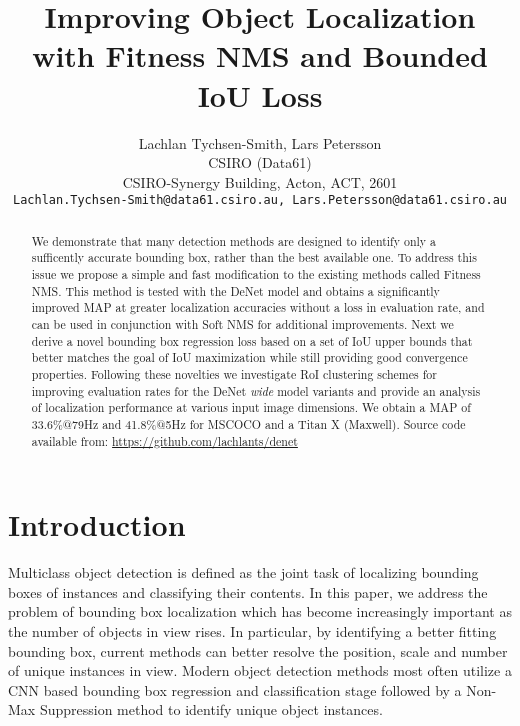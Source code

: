 \documentclass[10pt,twocolumn,letterpaper]{article}
\begin{document}
\title{Improving Object Localization with Fitness NMS and Bounded IoU Loss}

\author{Lachlan Tychsen-Smith, Lars Petersson\\
CSIRO (Data61)\\
CSIRO-Synergy Building, Acton, ACT, 2601\\
{\tt\small Lachlan.Tychsen-Smith@data61.csiro.au, \tt\small Lars.Petersson@data61.csiro.au}}

\maketitle

\begin{abstract}We demonstrate that many detection methods are designed to identify only a sufficently accurate bounding box, rather than the best available one. To address this issue we propose a simple and fast modification to the existing methods called Fitness NMS. This method is tested with the DeNet model and obtains a significantly improved MAP at greater localization accuracies without a loss in evaluation rate, and can be used in conjunction with Soft NMS for additional improvements. Next we derive a novel bounding box regression loss based on a set of IoU upper bounds that better matches the goal of IoU maximization while still providing good convergence properties. Following these novelties we investigate RoI clustering schemes for improving evaluation rates for the DeNet \textit{wide} model variants and provide an analysis of localization performance at various input image dimensions. We obtain a MAP of 33.6\%@79Hz and 41.8\%@5Hz for MSCOCO and a Titan X (Maxwell). Source code available from: \url{https://github.com/lachlants/denet}
\end{abstract}

\section{Introduction}
Multiclass object detection is defined as the joint task of localizing bounding boxes of instances and classifying their contents. In this paper, we address the problem of bounding box localization which has become increasingly important as the number of objects in view rises. In particular, by identifying a better fitting bounding box, current methods can better resolve the position, scale and number of unique instances in view. Modern object detection methods most often utilize a CNN\cite{lenet} based bounding box regression and classification stage followed by a Non-Max Suppression method to identify unique object instances. 
\end{document}

